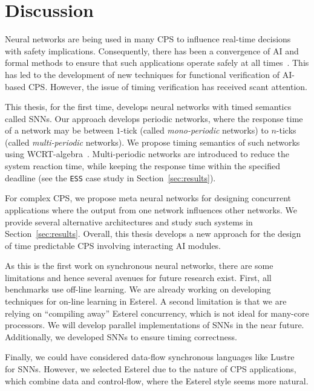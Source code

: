 \section{Discussion}
\label{sec:conclusions}

Neural networks are being used in many \acf{CPS} to influence
real-time decisions with safety implications. Consequently, there has
been a convergence of AI and formal methods to ensure that such
applications operate safely at all times~\cite{seshia2016towards}. This has led to the development of new
techniques for functional verification of AI-based \ac{CPS}. However,
the issue of timing verification has received scant attention. 

This thesis, for the first time, develops neural networks with timed
semantics called \acfp{SNN}. Our approach develops periodic networks,
where the response time of a network may be between $1$-tick (called
\emph{mono-periodic} networks) to $n$-ticks (called
\emph{multi-periodic} networks). We propose timing semantics of such
networks using \ac{WCRT}-algebra~\cite{wang2017timing}. Multi-periodic networks are
introduced to reduce the system reaction time, while keeping the
response time within the specified deadline (see the \texttt{ESS} case
study in Section~\ref{sec:results}). 

For complex CPS, we propose meta neural networks for designing concurrent applications where the output from
one network influences other networks. We provide several alternative
architectures and study such systems in
Section~\ref{sec:results}. Overall, this thesis develops a new approach
for the design of time predictable \acf{CPS} involving interacting 
AI modules.

As this is the first work on synchronous neural networks,
there are some limitations and hence several avenues
for future research exist. First, all benchmarks use off-line learning. We are already
working on developing techniques for on-line learning in Esterel. A
second limitation is that we are relying on ``compiling away'' Esterel
concurrency, which is not ideal for many-core processors. We will develop parallel implementations
of \acp{SNN} in the near future. 
Additionally, we developed \acp{SNN} to ensure timing correctness. 
Finally, we could have considered
data-flow synchronous languages like Lustre~\cite{benveniste2003synchronous} for
\acp{SNN}. However, we selected Esterel due to the nature of \ac{CPS}
applications, which combine data and control-flow, where the Esterel
style seems more natural.
